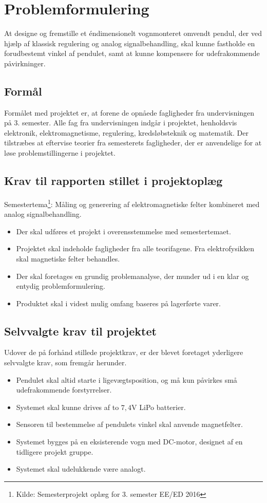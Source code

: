 
\section{Problemformulering}
At designe og fremstille et éndimensionelt vognmonteret omvendt pendul, der ved hjælp af klassisk regulering og analog signalbehandling, skal kunne fastholde en forudbestemt vinkel af pendulet, samt at kunne kompensere for udefrakommende påvirkninger. 

\subsection{Formål}
Formålet med projektet er, at forene de opnåede fagligheder fra undervisningen på 3. semester. 
Alle fag fra undervisningen indgår i projektet, henholdsvis elektronik, elektromagnetisme, regulering, kredsløbsteknik og matematik.
Der tilstræbes at eftervise teorier fra semesterets fagligheder, der er anvendelige for at løse problemstillingerne i projektet. 


\subsection{Krav til rapporten stillet i projektoplæg}
Semestertema\footnote{Kilde: Semesterprojekt oplæg for 3. semester EE/ED 2016}: Måling og generering af elektromagnetiske felter kombineret med analog signalbehandling.
\begin{itemize}
\item Der skal udføres et projekt i overensstemmelse med semestertemaet.
\item Projektet skal indeholde fagligheder fra alle teorifagene. Fra elektrofysikken skal
magnetiske felter behandles.
\item Der skal foretages en grundig problemanalyse, der munder ud i en klar og entydig
problemformulering.
\item Produktet skal i videst mulig omfang baseres på lagerførte varer.
\end{itemize}

\subsection{Selvvalgte krav til projektet} \label{afs:kravspecifikation}
Udover de på forhånd stillede projektkrav, er der blevet foretaget yderligere selvvalgte krav, som fremgår herunder.
\begin{itemize}
\item Pendulet skal altid starte i ligevægtsposition, og må kun påvirkes små udefrakommende forstyrrelser.
\item Systemet skal kunne drives af to $7,4\si{\volt}$ LiPo batterier.
\item Sensoren til bestemmelse af pendulets vinkel skal anvende magnetfelter.
\item Systemet bygges på en eksisterende vogn med DC-motor, designet af en tidligere projekt gruppe. 
\item Systemet skal udelukkende være analogt. 
\end{itemize}

